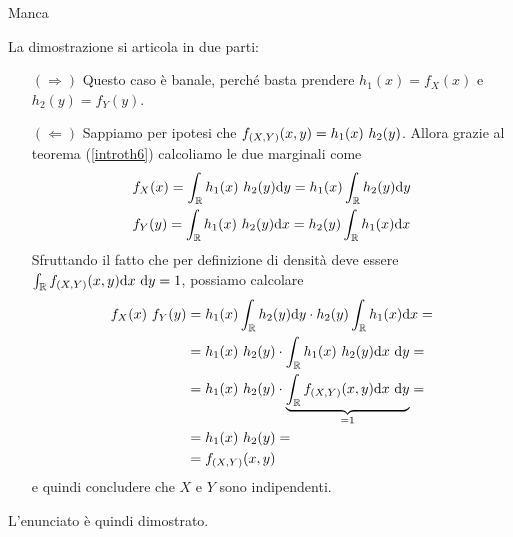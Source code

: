 \ParteSoluzioni

\Soluzione{}
Manca

\Soluzione{}
La dimostrazione si articola in due parti:
\begin{enumerate}
\item [$(\Rightarrow)$] Questo caso è banale, perché basta prendere $h_1(x)=f_X(x)$ e $h_2(y)=f_Y(y)$.

\item [$(\Leftarrow)$] Sappiamo per ipotesi che $\fXYxy=h_1(x)\ h_2(y)$. Allora grazie al teorema (\ref{introth6}) calcoliamo le due marginali come
\begin{gather*}
\begin{aligned}
&f_X(x)=\int_{\mathbb{R}} h_1(x)\ h_2(y) \mathrm{d} y=h_1(x)\int_{\mathbb{R}} h_2(y) \mathrm{d} y \\
&f_Y(y)=\int_{\mathbb{R}} h_1(x)\ h_2(y) \mathrm{d} x=h_2(y)\int_{\mathbb{R}} h_1(x) \mathrm{d} x
\end{aligned}
\end{gather*}
Sfruttando il fatto che per definizione di densità deve essere $\int_{\mathbb{R}}f_{(X,Y)}(x,y)\mathrm{d} x\ \mathrm{d} y=1$, possiamo calcolare
\begin{gather*}
\begin{aligned}
f_X(x)\ f_Y(y)&=h_1(x)\int_{\mathbb{R}} h_2(y) \mathrm{d} y\cdot h_2(y)\int_{\mathbb{R}} h_1(x) \mathrm{d} x=\\
&=h_1(x)\ h_2(y) \cdot \int_{\mathbb{R}} h_1(x)\ h_2(y) \mathrm{d} x\ \mathrm{d} y=\\
&=h_1(x)\ h_2(y) \cdot \underbrace{\int_{\mathbb{R}} f_{(X,Y)}(x,y) \mathrm{d} x\ \mathrm{d} y}_{=1}=\\
&=h_1(x)\ h_2(y)=\\
&=f_{(X,Y)}(x,y)
\end{aligned}
\end{gather*}
e quindi concludere che $X$ e $Y$ sono indipendenti.
\end{enumerate}
L'enunciato è quindi dimostrato.

